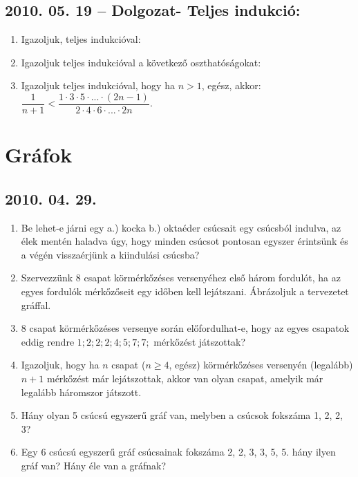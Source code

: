 \subsection*{2010. 05. 19 -- Dolgozat- Teljes indukció:}
\begin{enumerate}
\item Igazoljuk, teljes indukcióval:
\item Igazoljuk teljes indukcióval a következő oszthatóságokat:
\item Igazoljuk teljes indukcióval, hogy ha $n>1$, egész, akkor:
$\dfrac{1}{n+1}<\dfrac{1\cdot3\cdot5\cdot...\cdot(2n-1)}{2\cdot4\cdot6\cdot...\cdot2n}$.
\end{enumerate}


\section{Gráfok}

\subsection*{2010. 04. 29.}
\begin{enumerate}
\item Be lehet-e járni egy a.) kocka b.) oktaéder csúcsait egy csúcsból indulva, az élek mentén haladva úgy, hogy minden csúcsot pontosan egyszer érintsünk és a végén visszaérjünk a kiindulási csúcsba?
\item Szervezzünk 8 csapat körmérkőzéses versenyéhez első három fordulót, ha az egyes fordulók mérkőzőseit egy időben kell lejátszani. Ábrázoljuk a tervezetet gráffal.
\item 8 csapat körmérkőzéses versenye során előfordulhat-e, hogy az egyes csapatok eddig rendre $1; 2; 2; 2; 4; 5; 7; 7;$ mérkőzést játszottak?
\item Igazoljuk, hogy ha $n$ csapat ($n\geq 4$, egész) körmérkőzéses versenyén (legalább) $n+1$ mérkőzést már lejátszottak, akkor van olyan csapat, amelyik már legalább háromszor játszott.
\item Hány olyan 5 csúcsú egyszerű gráf van, melyben a csúcsok fokszáma 1, 2, 2, 3?
\item Egy 6 csúcsú egyszerű gráf csúcsainak fokszáma 2, 2, 3, 3, 5, 5. hány ilyen gráf van? Hány éle van a gráfnak?
\end{enumerate}


